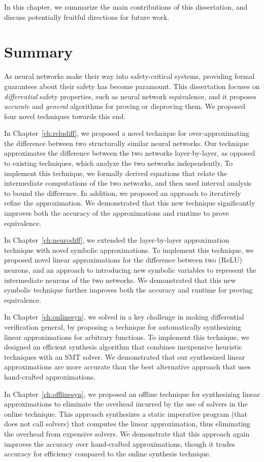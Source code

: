 In this chapter, we summarize the main contributions of this dissertation,
and discuss potentially fruitful directions for future work.

\section{Summary}
As neural networks make their way into safety-critical systems, providing
formal guarantees about their safety has become paramount. This
dissertation focuses on \textit{differential} safety properties, such as
neural network equivalence, and it proposes \textit{accurate} and
\textit{general} algorithms for proving or disproving them. We proposed
four novel techniques towards this end.

In Chapter~\ref{ch:reludiff}, we proposed a novel technique for
over-approximating the difference between two structurally similar neural
networks. Our technique approximates the difference between the two
networks layer-by-layer, as opposed to existing techniques, which analyze
the two networks independently. To implement this technique, we formally
derived equations that relate the intermediate computations of the two
networks, and then used interval analysis to bound the difference. In
addition, we proposed an approach to iteratively refine the approximation.
We demonstrated that this new technique significantly improves both the
accuracy of the approximations and runtime to prove equivalence.

In Chapter~\ref{ch:neurodiff}, we extended the layer-by-layer approximation
technique with novel symbolic approximations. To implement this technique,
we proposed novel linear approximations for the difference between two
(ReLU) neurons, and an approach to introducing new symbolic variables to
represent the intermediate neurons of the two networks. We demonstrated
that this new symbolic technique further improves both the accuracy and
runtime for proving equivalence.

In Chapter~\ref{ch:onlinesyn}, we solved in a key challenge in making
differential verification general, by proposing a technique for
automatically synthesizing linear approximations for arbitrary functions.
To implement this technique, we designed an efficient synthesis algorithm
that combines inexpensive heuristic techniques with an SMT solver. We
demonstrated that our synthesized linear approximations are more accurate
than the best alternative approach that uses hand-crafted approximations.

In Chapter~\ref{ch:offlinesyn}, we proposed an offline technique for
synthesizing linear approximations to eliminate the overhead incurred by
the use of solvers in the online technique. This approach synthesizes a
static imperative program (that does not call solvers) that computes the
linear approximation, thus eliminating the overhead from expensive solvers.
We demonstrate that this approach again improves the accuracy over
hand-crafted approximations, though it trades accuracy for efficiency
compared to the online synthesis technique.

